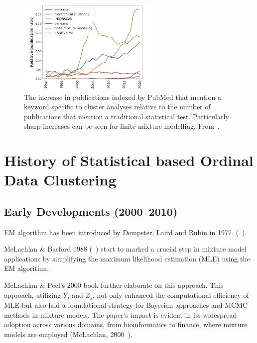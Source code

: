\documentclass{article}
\begin{document}
\begin{figure}[ht!] %
    \centering %
    \includegraphics[width=0.6\textwidth]{images/trend.png} %
    \caption{The increase in publications indexed by PubMed that mention a keyword specific to cluster analyses relative to the number of publications 
    that mention a traditional statistical test. 
    Particularly sharp increases can be seen for finite mixture modelling.
    From~\cite{dalmaijer2022statistical}.} %
    \label{fig:trend} %
  \end{figure}


\section{History of Statistical based Ordinal Data Clustering}

\subsection*{Early Developments (2000--2010)}

EM algorithm has been introduced by Dempster, Laird and Rubin in 1977. (~\cite*[Dempster, Laird and Rubin]{Dempster1977}).

McLachlan \& Basford 1988 (~\cite{mclachlan1988mixture}) start to marked a crucial step in mixture model applications by simplifying the maximum likelihood estimation (MLE) using the EM algorithm.

McLachlan \& Peel's 2000 book further elaborate on this approach. This approach, utilizing $Y_j$ and $Z_j$, not only enhanced the computational efficiency of MLE but also laid a foundational strategy for Bayesian approaches and MCMC methods in mixture models. The paper’s impact is evident in its widespread adoption across various domains, from bioinformatics to finance, where mixture models are employed (McLachlan, 2000~\cite{mclachlan2000finite}).
\end{document}
